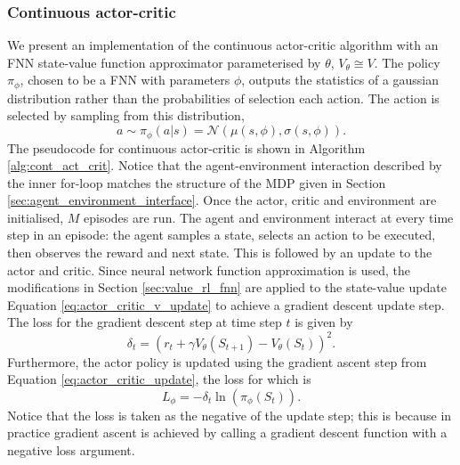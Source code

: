 \subsubsection{Continuous actor-critic}
\label{sec:cont_act_crit}

We present an implementation of the continuous actor-critic algorithm with an FNN state-value function approximator parameterised by $\theta$, $V_{\theta} \cong V$.
The policy $\pi_\phi$, chosen to be a FNN with parameters $\phi$, outputs the statistics of a gaussian distribution rather than the probabilities of selection each action. The action is selected by sampling from this distribution,
\begin{equation}
    a \sim \pi_{\phi}(a|s) = \mathcal{N}(\mu(s,\phi), \sigma(s,\phi)).
\label{eq:act_crit_act}
\end{equation}
The pseudocode for continuous actor-critic is shown in Algorithm \ref{alg:cont_act_crit}. Notice that the agent-environment interaction described by the inner for-loop matches the structure of the MDP given in Section \ref{sec:agent_environment_interface}. 
Once the actor, critic and environment are initialised, $M$ episodes are run.
The agent and environment interact at every time step in an episode: the agent samples a state, selects an action to be executed, then observes the reward and next state. This is followed by an update to the actor and critic. 
Since neural network function approximation is used, the modifications in Section \ref{sec:value_rl_fnn} are applied to the state-value update Equation \ref{eq:actor_critic_v_update} to achieve a gradient descent update step. The loss for the gradient descent step at time step $t$ is given by
\begin{equation}
    \delta_t = (r_t + \gamma V_\theta(S_{t+1}) - V_\theta(S_t))^2.
\end{equation}
Furthermore, the actor policy is updated using the gradient ascent step from Equation \ref{eq:actor_critic_update}, the loss for which is
\begin{equation}
    L_\phi = - \delta_t \ln(\pi_\phi(S_t)).
\end{equation}
Notice that the loss is taken as the negative of the update step; this is because in practice gradient ascent is achieved by calling a gradient descent function with a negative loss argument.


